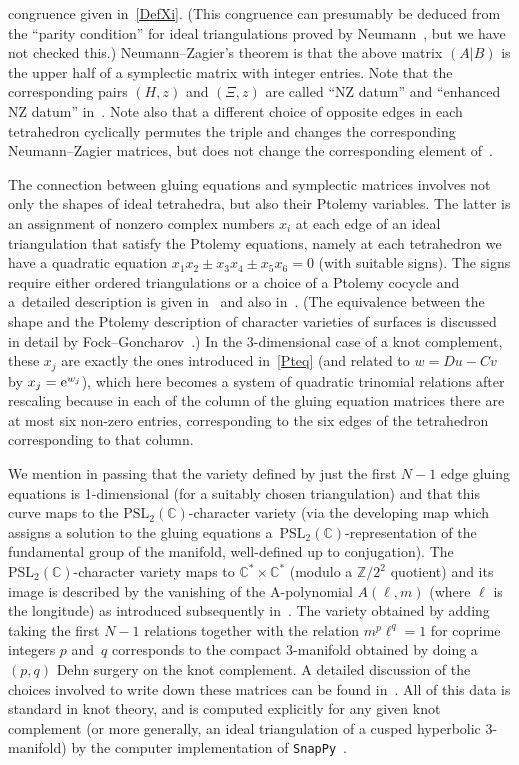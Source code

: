 \documentclass[pdftex]{sigma}
\numberwithin{equation}{section}
\def\BZ{\mathbb Z}
\def\BC{\mathbb C}
\def\PSL{\mathrm{PSL}}
\def\C{\mathbb C}
\begin{document}
congruence given in~\eqref{DefXi}. (This congruence can presumably be deduced from
the ``parity condition'' for
ideal triangulations proved by Neumann~\cite{WN:comb}, but we have not checked this.)
Neumann--Zagier's theorem is that the above matrix $(A  | B)$ is the upper half of
a symplectic
matrix with integer entries. Note that the corresponding pairs $(H,z)$ and $(\Xi,z)$
are called
``NZ datum'' and ``enhanced NZ datum'' in~\cite{DG}. Note also that a different choice
of opposite edges in each tetrahedron cyclically permutes the triple 
and changes the corresponding Neumann--Zagier matrices, but does not change the
corresponding element of~\smash{$\hB(\C)$}.

The connection between gluing equations and symplectic matrices involves not only
the shapes of ideal tetrahedra, but also their Ptolemy variables. The latter is
an assignment of nonzero complex numbers $x_i$ at each edge of an ideal triangulation
that satisfy the Ptolemy equations, namely at each tetrahedron we have a quadratic
equation $x_1 x_2 \pm x_3 x_4 \pm x_5 x_6 =0$ (with suitable signs). The signs require
either ordered triangulations or a choice of a Ptolemy cocycle and a~detailed
description is given in~\cite[equation 12.2]{GTZ:complex} and also in~\cite[Section~3]{GGZ}.
(The equivalence between the shape and the Ptolemy description of character varieties
of surfaces is discussed in detail by Fock--Goncharov~\cite{Fock-Goncharov}.)
In the 3-dimensional case of a knot complement,
these $x_j$ are exactly the ones introduced
in~\eqref{Pteq}
(and related to $w=Du-Cv$ by $x_j={\rm e}^{w_j}$), which here becomes a system of quadratic
trinomial relations after rescaling because in each of the column of the gluing
equation matrices there are at most six non-zero entries, corresponding to the
six edges of the tetrahedron corresponding to that column.

We mention in passing that the variety defined by just the first $N-1$ edge gluing
equations is 1-dimensional (for a suitably chosen triangulation) and that this
curve maps to the $\PSL_2(\BC)$-character variety (via the developing map which
assigns a solution to the gluing equations a~$\PSL_2(\BC)$-representation of
the fundamental group of the manifold, well-defined up to conjugation). The
$\PSL_2(\BC)$-character variety maps to $\BC^* \times \BC^*$
(modulo a $\BZ/2^2$ quotient) and its image is described by the vanishing of the
A-polynomial $A(\ell,m)$
(where $\ell$ is the longitude) as introduced subsequently in~\cite{CCGLS}.
The variety obtained by adding taking the first $N-1$ relations together with the
relation $m^p\ell^q=1$ for coprime integers $p$ and~$q$ corresponds to the compact
3-manifold obtained by doing a $(p,q)$ Dehn surgery on the knot complement. A detailed
discussion of the choices involved to write down these matrices can be found in~\cite[Section~2, Appendix~A]{DG}. All of this data is standard in knot theory,
and is computed explicitly for any given knot complement (or more generally, an ideal
triangulation of a cusped hyperbolic 3-manifold) by the computer implementation of
\texttt{SnapPy}~\cite{snappy}.
\end{document}
